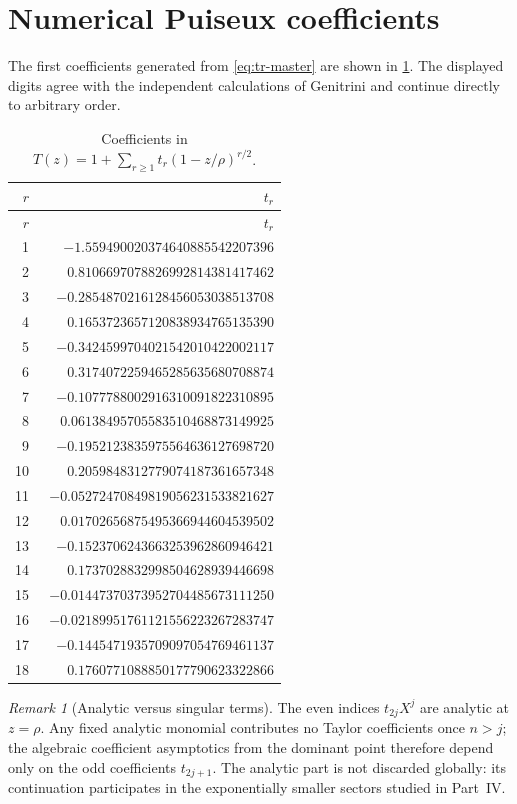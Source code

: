 \documentclass[11pt,a4paper,oneside,openany]{book}
\theoremstyle{definition}
\theoremstyle{remark}
\newtheorem{remark}[theorem]{Remark}
\begin{document}
\section{Numerical Puiseux coefficients}
The first coefficients generated from \cref{eq:tr-master} are shown in
\cref{tab:puiseux}.  The displayed digits agree with the independent
calculations of Genitrini and continue directly to arbitrary order.

\begin{longtable}{r@{\qquad}r}
\caption{Coefficients in $T(z)=1+\sum_{r\ge1}t_r(1-z/\rho)^{r/2}$.}
\label{tab:puiseux}\\
\toprule
$r$ & $t_r$\\
\midrule
\endfirsthead
\toprule
$r$ & $t_r$\\
\midrule
\endhead
1  & $-1.559490020374640885542207396$\\
2  & $ \phantom{-}0.8106697078826992814381417462$\\
3  & $-0.2854870216128456053038513708$\\
4  & $ \phantom{-}0.1653723657120838934765135390$\\
5  & $-0.3424599704021542010422002117$\\
6  & $ \phantom{-}0.3174072259465285635680708874$\\
7  & $-0.1077788002916310091822310895$\\
8  & $ \phantom{-}0.06138495705583510468873149925$\\
9  & $-0.1952123835975564636127698720$\\
10 & $ \phantom{-}0.2059848312779074187361657348$\\
11 & $-0.05272470849819056231533821627$\\
12 & $ \phantom{-}0.01702656875495366944604539502$\\
13 & $-0.1523706243663253962860946421$\\
14 & $ \phantom{-}0.1737028832998504628939446698$\\
15 & $-0.01447370373952704485673111250$\\
16 & $-0.02189951761121556223267283747$\\
17 & $-0.1445471935709097054769461137$\\
18 & $ \phantom{-}0.1760771088850177790623322866$\\
\bottomrule
\end{longtable}

\begin{remark}[Analytic versus singular terms]
The even indices $t_{2j}X^j$ are analytic at $z=\rho$.  Any fixed analytic
monomial contributes no Taylor coefficients once $n>j$; the algebraic
coefficient asymptotics from the dominant point therefore depend only on the
odd coefficients $t_{2j+1}$.  The analytic part is not discarded globally: its
continuation participates in the exponentially smaller sectors studied in
Part~IV.
\end{remark}
\end{document}
